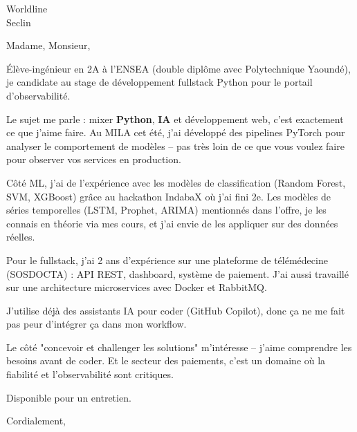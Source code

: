 \documentclass[11pt,a4paper]{letter}
\begin{document}
\begin{letter}{Worldline\\
Seclin}

\opening{Madame, Monsieur,}

Élève-ingénieur en 2A à l'ENSEA (double diplôme avec Polytechnique Yaoundé), je candidate au stage de développement fullstack Python pour le portail d'observabilité.

Le sujet me parle : mixer \textbf{Python}, \textbf{IA} et développement web, c'est exactement ce que j'aime faire. Au MILA cet été, j'ai développé des pipelines PyTorch pour analyser le comportement de modèles -- pas très loin de ce que vous voulez faire pour observer vos services en production.

Côté ML, j'ai de l'expérience avec les modèles de classification (Random Forest, SVM, XGBoost) grâce au hackathon IndabaX où j'ai fini 2e. Les modèles de séries temporelles (LSTM, Prophet, ARIMA) mentionnés dans l'offre, je les connais en théorie via mes cours, et j'ai envie de les appliquer sur des données réelles.

Pour le fullstack, j'ai 2 ans d'expérience sur une plateforme de télémédecine (SOSDOCTA) : API REST, dashboard, système de paiement. J'ai aussi travaillé sur une architecture microservices avec Docker et RabbitMQ.

J'utilise déjà des assistants IA pour coder (GitHub Copilot), donc ça ne me fait pas peur d'intégrer ça dans mon workflow.

Le côté "concevoir et challenger les solutions" m'intéresse -- j'aime comprendre les besoins avant de coder. Et le secteur des paiements, c'est un domaine où la fiabilité et l'observabilité sont critiques.

Disponible pour un entretien.

\closing{Cordialement,}

\end{letter}
\end{document}
